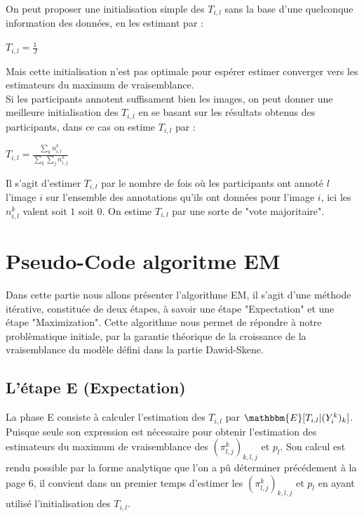 \documentclass[frenchb]{report}
\newcommand{\1}{\mathbbm{1}}
\newcommand{\E}{\mathbbm{E}}
\theoremstyle{definition}\newtheorem{defn}{Définition}
\theoremstyle{definition}\newtheorem{exm}{Exemple}
\theoremstyle{definition}\newtheorem{nota}{Notation}
\theoremstyle{definition}\newtheorem{rem}{Remarque}
\begin{document}
On peut proposer une initialisation simple des  $T_{i,l}$ sans la base d'une quelconque information des données, en les estimant par : 

\begin{center}
	$T_{i,l} = \displaystyle \frac{1}{J}$
\end{center}

Mais cette initialisation n'est pas optimale pour espérer estimer converger vers les estimateurs du maximum de vraisemblance.\\

Si les participants annotent suffisament bien les images, on peut donner une meilleure initialisation des $T_{i,l}$ en se basant sur les résultats obtenus des participants, dans ce cas on estime $T_{i,l}$ par : 

\begin{center}
	 $T_{i,l} = \displaystyle \frac{ \displaystyle \sum_k n_{i,l}^k}{\displaystyle \sum_k \displaystyle \sum_j n_{i,j}^k}$
\end{center}

Il s'agit d'estimer $T_{i,l}$ par le nombre de fois où les participants ont annoté $l$ l'image $i$ sur l'ensemble des annotations qu'ils ont données pour l'image $i$, ici les $n_{i,l}^k$ valent soit $1$ soit $0$. On estime $T_{i,l}$ par une sorte de "vote majoritaire".

\chapter{Pseudo-Code algoritme EM}

Dans cette partie nous allons présenter l'algorithme EM, il s'agit d'une méthode itérative, constituée de deux étapes, à savoir une étape "Expectation" et une étape "Maximization". Cette algorithme nous permet de répondre à notre problèmatique initiale, par la garantie théorique de la croissance de la vraisemblance du modèle défini dans la partie Dawid-Skene.

\section{L'étape E (Expectation)}

La phase E consiste à calculer l'estimation des $T_{i,l}$ par $\E[T_{i,l}|(Y^k_i)_k]$.\\
Puisque seule son expression est nécessaire pour obtenir l'estimation des estimateurs du maximum de vraisemblance des $(\pi^k_{l,j})_{k,l,j}$ et $p_l$. Son calcul est rendu possible par la forme analytique que l'on a pû déterminer précédement à la page $6$, il convient dans un premier temps d'estimer les $(\pi^k_{l,j})_{k,l,j}$ et $p_l$ en ayant utilisé l'initialisation des $T_{i,l}$.
\end{document}
